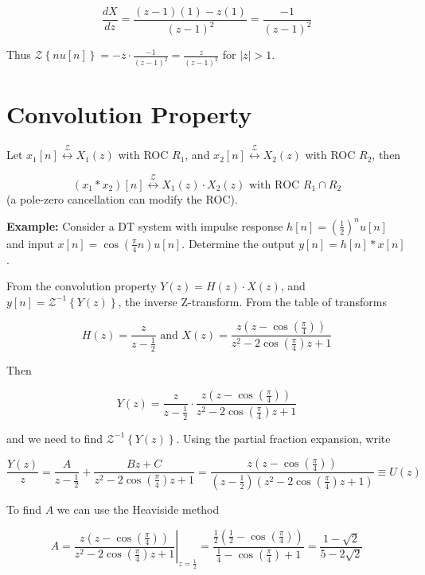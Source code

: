 \documentclass{article}
\begin{document}
\[
	\frac{dX}{dz} = \frac{(z-1)(1) - z(1)}{(z-1)^2} = \frac{-1}{(z-1)^2}
\]

Thus $\mathcal{Z}\left\{nu[n]\right\} = -z \cdot \frac{-1}{(z-1)^2} = \frac{z}{(z-1)^2}$ for $|z| > 1$.

\section{Convolution Property}

Let $x_1[n] \stackrel{\mathcal{Z}}{\longleftrightarrow} X_1(z)$ with ROC $R_1$, and $x_2[n] \stackrel{\mathcal{Z}}{\longleftrightarrow} X_2(z)$ with ROC $R_2$, then

\[
	(x_1 * x_2)[n] \stackrel{\mathcal{Z}}{\longleftrightarrow} X_1(z) \cdot X_2(z) \mbox{ with ROC } R_1 \cap R_2
\]
(a pole-zero cancellation can modify the ROC).

\textbf{Example:} Consider a DT system with impulse response $h[n] = \left(\frac{1}{2}\right)^n u[n]$ and input $x[n] = \cos\left(\frac{\pi}{4}n\right)u[n]$. Determine the output $y[n] = h[n]*x[n]$.

From the convolution property $Y(z) = H(z) \cdot X(z)$, and $y[n] = \mathcal{Z}^{-1}\left\{ Y(z)\right\}$, the inverse Z-transform. From the table of transforms

\[
	H(z) = \frac{z}{z-\frac{1}{2}} \mbox{ and } X(z) = \frac{z\left(z-\cos\left(\frac{\pi}{4}\right)\right)}{z^2 -2\cos\left(\frac{\pi}{4}\right)z + 1}
\]

Then

\[
	Y(z) = \frac{z}{z-\frac{1}{2}} \cdot \frac{z\left(z-\cos\left(\frac{\pi}{4}\right)\right)}{z^2 -2\cos\left(\frac{\pi}{4}\right)z + 1}
\]

and we need to find $\mathcal{Z}^{-1}\left\{ Y(z)\right\}$. Using the partial fraction expansion, write

\[
	\frac{Y(z)}{z} = \frac{A}{z-\frac{1}{2}} + \frac{Bz + C}{z^2 -2\cos\left(\frac{\pi}{4}\right)z + 1} = \frac{z\left(z-\cos\left(\frac{\pi}{4}\right)\right)}{\left(z-\frac{1}{2}\right)\left(z^2 -2\cos\left(\frac{\pi}{4}\right)z + 1\right)} \equiv U(z)
\]

To find $A$ we can use the Heaviside method

\[
	A = \left. \frac{z\left(z-\cos\left(\frac{\pi}{4}\right)\right)}{z^2 -2\cos\left(\frac{\pi}{4}\right)z + 1} \right|_{z = \frac{1}{2}} =  \frac{\frac{1}{2}\left(\frac{1}{2}-\cos\left(\frac{\pi}{4}\right)\right)}{\frac{1}{4} -\cos\left(\frac{\pi}{4}\right) + 1} = \frac{1-\sqrt{2}}{5-2\sqrt{2}}
\]
\end{document}
